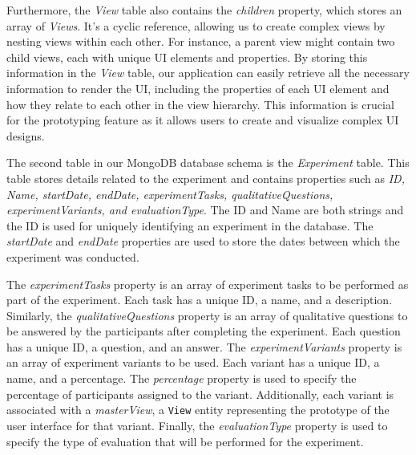 Furthermore, the \textit{View} table also contains the \textit{children} property, which stores an array of \textit{Views}. 
It's a cyclic reference, allowing us to create complex views by nesting views within each other. 
For instance, a parent view might contain two child views, each with unique UI elements and properties.
By storing this information in the \textit{View} table, our application can easily retrieve all the necessary information to render the UI, including the properties of each UI element and how they relate to each other in the view hierarchy. 
This information is crucial for the prototyping feature as it allows users to create and visualize complex UI designs.

The second table in our MongoDB database schema is the \textit{Experiment} table. 
This table stores details related to the experiment and contains properties such as \textit{ID, Name, startDate, endDate, experimentTasks, qualitativeQuestions, experimentVariants, and evaluationType}.
The ID and Name are both strings and the ID is used for uniquely identifying an experiment in the database. 
The \textit{startDate} and \textit{endDate} properties are used to store the dates between which the experiment was conducted.

The \textit{experimentTasks} property is an array of experiment tasks to be performed as part of the experiment. 
Each task has a unique ID, a name, and a description.
Similarly, the \textit{qualitativeQuestions} property is an array of qualitative questions to be answered by the participants after completing the experiment. 
Each question has a unique ID, a question, and an answer.
The \textit{experimentVariants} property is an array of experiment variants to be used. 
Each variant has a unique ID, a name, and a percentage. The \textit{percentage} property is used to specify the percentage of participants assigned to the variant. 
Additionally, each variant is associated with a \textit{masterView}, a \texttt{View} entity representing the prototype of the user interface for that variant.
Finally, the \textit{evaluationType} property is used to specify the type of evaluation that will be performed for the experiment.

